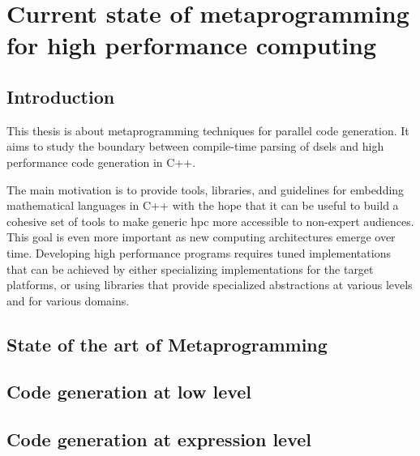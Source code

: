 \documentclass[english,12pt,a4paper]{book}
\providecommand{\cpp}{\textsc{C++}\xspace}
\begin{document}
\tableofcontents




\part{Current state of metaprogramming for high performance computing}

\chapter{
  Introduction
}

This thesis is about metaprogramming techniques for parallel code generation.
It aims to study the boundary between compile-time parsing of
\glspl{dsel} and high performance code generation in \cpp.

The main motivation is to provide tools, libraries, and guidelines for embedding
mathematical languages in \cpp with the hope that it can be useful to build a
cohesive set of tools to make generic \gls{hpc} more accessible
to non-expert audiences. This goal is even more important as new computing
architectures emerge over time. Developing high performance programs requires
tuned implementations that can be achieved by either specializing
implementations for the target platforms, or using libraries that provide
specialized abstractions at various levels and for various domains.

\chapter{
  State of the art of Metaprogramming
}




\chapter{
  Code generation at low level
}



\chapter{
  Code generation at expression level
}
\end{document}
